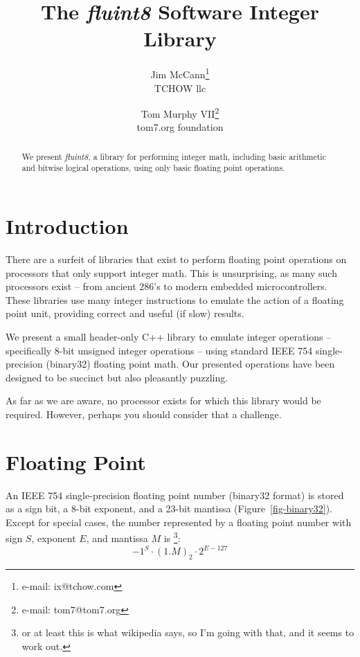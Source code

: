 \documentclass{acmsiggraph}
\title{The {\em fluint8} Software Integer Library}
\author{Jim McCann\thanks{e-mail: ix@tchow.com}\\TCHOW llc
  \and
  Tom Murphy VII\thanks{e-mail: tom7@tom7.org}\\tom7.org foundation}
\theoremstyle{remark}
\theoremstyle{definition}
\begin{document}
\maketitle

\begin{abstract}
We present {\em fluint8}, a library for performing integer math, including basic arithmetic and bitwise logical operations, using only basic floating point operations.
\end{abstract}

\begin{CRcatlist}
\end{CRcatlist}

\section{Introduction}
There are a surfeit of libraries that exist to perform floating point operations on processors that only support integer math.
This is unsurprising, as many such processors exist -- from ancient 286's to modern embedded microcontrollers.
These libraries use many integer instructions to emulate the action of a floating point unit, providing correct and useful (if slow) results.

We present a small header-only C++ library to emulate integer operations -- specifically 8-bit unsigned integer operations -- using standard IEEE 754 single-precision (binary32) floating point math.
Our presented operations have been designed to be succinct but also pleasantly puzzling.

As far as we are aware, no processor exists for which this library would be required.
However, perhaps you should consider that a challenge.

\section{Floating Point}
An IEEE 754 single-precision floating point number (binary32 format) is stored as a sign bit, a 8-bit exponent, and a 23-bit mantissa (Figure~\ref{fig-binary32}).
Except for special cases, the number represented by a floating point number with sign $S$, exponent $E$, and mantissa $M$ is
\footnote{or at least this is what wikipedia says, so I'm going with that, and it seems to work out.}:
\begin{displaymath}
-1^{S}\cdot (1.M)_2 \cdot 2^{E-127}
\end{displaymath}
\end{document}
